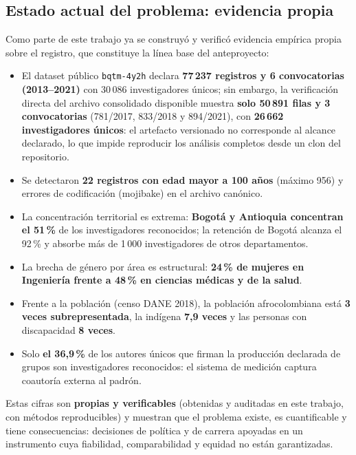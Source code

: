 \subsection{Estado actual del problema: evidencia propia}

Como parte de este trabajo ya se construyó y verificó evidencia empírica
propia sobre el registro, que constituye la línea base del anteproyecto:

\begin{itemize}
  \item El dataset público \texttt{bqtm-4y2h} declara \textbf{77\,237
        registros y 6 convocatorias (2013--2021)} con 30\,086 investigadores
        únicos; sin embargo, la verificación directa del archivo consolidado
        disponible muestra \textbf{solo 50\,891 filas y 3 convocatorias}
        (781/2017, 833/2018 y 894/2021), con \textbf{26\,662 investigadores
        únicos}: el artefacto versionado no corresponde al alcance declarado,
        lo que impide reproducir los análisis completos desde un clon del
        repositorio.
  \item Se detectaron \textbf{22 registros con edad mayor a 100 años}
        (máximo 956) y errores de codificación (mojibake) en el archivo
        canónico.
  \item La concentración territorial es extrema: \textbf{Bogotá y Antioquia
        concentran el 51\,\%} de los investigadores reconocidos; la retención
        de Bogotá alcanza el 92\,\% y absorbe más de 1\,000 investigadores de
        otros departamentos.
  \item La brecha de género por área es estructural: \textbf{24\,\% de mujeres
        en Ingeniería frente a 48\,\% en ciencias médicas y de la salud}.
  \item Frente a la población (censo DANE 2018), la población afrocolombiana
        está \textbf{3 veces subrepresentada}, la indígena \textbf{7,9 veces} y
        las personas con discapacidad \textbf{8 veces}.
  \item Solo \textbf{el 36,9\,\%} de los autores únicos que firman la
        producción declarada de grupos son investigadores reconocidos: el
        sistema de medición captura coautoría externa al padrón.
\end{itemize}

Estas cifras son \textbf{propias y verificables} (obtenidas y auditadas en
este trabajo, con métodos reproducibles) y muestran que el problema existe, es
cuantificable y tiene consecuencias: decisiones de política y de carrera
apoyadas en un instrumento cuya fiabilidad, comparabilidad y equidad no están
garantizadas.

